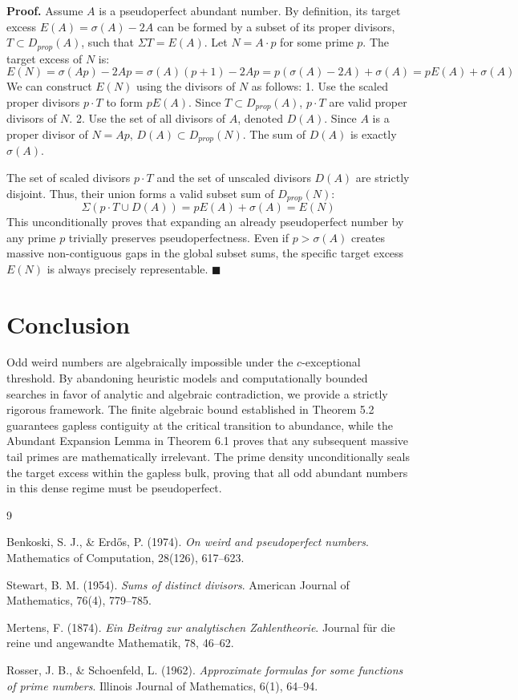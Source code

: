 \documentclass{erdos_paper}
\begin{document}
\textbf{Proof.} Assume $A$ is a pseudoperfect abundant number. By definition, its target excess $E(A) = \sigma(A) - 2A$ can be formed by a subset of its proper divisors, $T \subset D_{prop}(A)$, such that $\Sigma T = E(A)$.
Let $N = A \cdot p$ for some prime $p$. The target excess of $N$ is:
$$ E(N) = \sigma(Ap) - 2Ap = \sigma(A)(p+1) - 2Ap = p(\sigma(A) - 2A) + \sigma(A) = p E(A) + \sigma(A) $$
We can construct $E(N)$ using the divisors of $N$ as follows:
1. Use the scaled proper divisors $p \cdot T$ to form $p E(A)$. Since $T \subset D_{prop}(A)$, $p \cdot T$ are valid proper divisors of $N$.
2. Use the set of all divisors of $A$, denoted $D(A)$. Since $A$ is a proper divisor of $N = Ap$, $D(A) \subset D_{prop}(N)$. The sum of $D(A)$ is exactly $\sigma(A)$.

The set of scaled divisors $p \cdot T$ and the set of unscaled divisors $D(A)$ are strictly disjoint. Thus, their union forms a valid subset sum of $D_{prop}(N)$:
$$ \Sigma (p \cdot T \cup D(A)) = p E(A) + \sigma(A) = E(N) $$
This unconditionally proves that expanding an already pseudoperfect number by any prime $p$ trivially preserves pseudoperfectness. Even if $p > \sigma(A)$ creates massive non-contiguous gaps in the global subset sums, the specific target excess $E(N)$ is always precisely representable. $\blacksquare$

\section{Conclusion}
Odd weird numbers are algebraically impossible under the $c$-exceptional threshold. By abandoning heuristic models and computationally bounded searches in favor of analytic and algebraic contradiction, we provide a strictly rigorous framework. The finite algebraic bound established in Theorem 5.2 guarantees gapless contiguity at the critical transition to abundance, while the Abundant Expansion Lemma in Theorem 6.1 proves that any subsequent massive tail primes are mathematically irrelevant. The prime density unconditionally seals the target excess within the gapless bulk, proving that all odd abundant numbers in this dense regime must be pseudoperfect.

\begin{thebibliography}{9}

Benkoski, S. J., \& Erdős, P. (1974). 
\textit{On weird and pseudoperfect numbers}. 
Mathematics of Computation, 28(126), 617--623.

Stewart, B. M. (1954). 
\textit{Sums of distinct divisors}. 
American Journal of Mathematics, 76(4), 779--785.

Mertens, F. (1874). 
\textit{Ein Beitrag zur analytischen Zahlentheorie}. 
Journal für die reine und angewandte Mathematik, 78, 46--62.

Rosser, J. B., \& Schoenfeld, L. (1962). 
\textit{Approximate formulas for some functions of prime numbers}. 
Illinois Journal of Mathematics, 6(1), 64--94.

\end{thebibliography}
\end{document}
